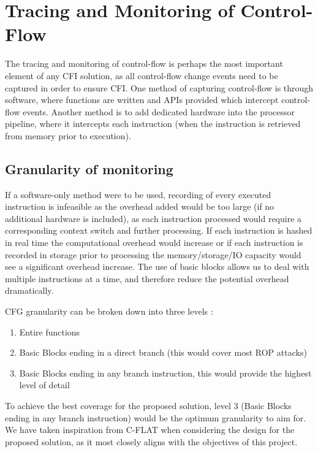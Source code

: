 \section{Tracing and Monitoring of Control-Flow}

The tracing and monitoring of control-flow is perhaps the most important element of any CFI solution, as all control-flow change events need to be captured in order to ensure CFI. One method of capturing control-flow is through software, where functions are written and APIs provided which intercept control-flow events. Another method is to add dedicated hardware into the processor pipeline, where it intercepts each instruction (when the instruction is retrieved from memory prior to execution).

\subsection{Granularity of monitoring}\label{implementationGranularity}

If a software-only method were to be used, recording of every executed instruction is infeasible as the overhead added would be too large (if no additional hardware is included), as each instruction processed would require a corresponding context switch and further processing. If each instruction is hashed in real time the computational overhead would increase or if each instruction is recorded in storage prior to processing the memory\slash storage\slash IO capacity would see a significant overhead increase. The use of basic blocks allows us to deal with multiple instructions at a time, and therefore reduce the potential overhead dramatically.

CFG granularity can be broken down into three levels \cite{Abera2016}:
\begin{enumerate}
	\item{Entire functions}
	\item{Basic Blocks ending in a direct branch (this would cover most ROP attacks)}
	\item{Basic Blocks ending in any branch instruction, this would provide the highest level of detail}
\end{enumerate}

To achieve the best coverage for the proposed solution, level 3 (Basic Blocks ending in any branch instruction) would be the optimum granularity to aim for. We have taken inspiration from C-FLAT\cite{Abera2016} when considering the design for the proposed solution, as it most closely aligns with the objectives of this project.

